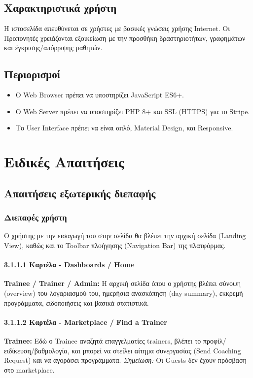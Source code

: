 \documentclass[12pt,a4paper]{report}
\begin{document}
\subsection{Χαρακτηριστικά χρήστη}
Η ιστοσελίδα απευθύνεται σε χρήστες με βασικές γνώσεις χρήσης Internet. Οι Προπονητές χρειάζονται εξοικείωση με την προσθήκη δραστηριοτήτων, γραφημάτων και έγκρισης/απόρριψης μαθητών.

\subsection{Περιορισμοί}
\begin{itemize}
    \item Ο Web Browser πρέπει να υποστηρίζει JavaScript ES6+.
    \item Ο Web Server πρέπει να υποστηρίζει PHP 8+ και SSL (HTTPS) για το Stripe.
    \item Το User Interface πρέπει να είναι απλό, Material Design, και Responsive.
\end{itemize}

\newpage

\section{Ειδικές Απαιτήσεις}

\subsection{Απαιτήσεις εξωτερικής διεπαφής}
\subsubsection{Διεπαφές χρήστη}
Ο χρήστης με την εισαγωγή του στην σελίδα θα βλέπει την αρχική σελίδα (Landing View), καθώς και το Toolbar πλοήγησης (Navigation Bar) της πλατφόρμας.

\paragraph{3.1.1.1 Καρτέλα - Dashboards / Home}
\textbf{Trainee / Trainer / Admin:} Η αρχική σελίδα όπου ο χρήστης βλέπει σύνοψη (overview) του λογαριασμού του, ημερήσια ανασκόπηση (day summary), εκκρεμή προγράμματα, ειδοποιήσεις και βασικά στατιστικά.

\paragraph{3.1.1.2 Καρτέλα - Marketplace / Find a Trainer}
\textbf{Trainee:} Εδώ ο Trainee αναζητά επαγγελματίες trainers, βλέπει το προφίλ/ειδίκευση/βαθμολογία, και μπορεί να στείλει αίτημα συνεργασίας (\textenglish{Send Coaching Request}) και να αγοράσει προγράμματα.
\textit{Σημείωση:} Οι Guests δεν έχουν πρόσβαση στο marketplace.
\end{document}
